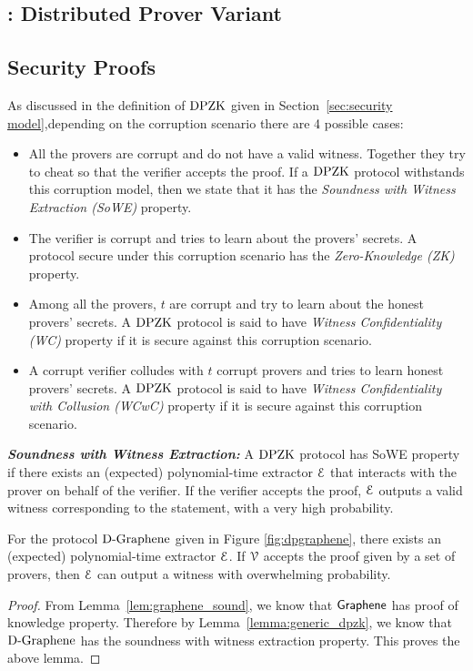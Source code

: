 
\subsection{\dpname: Distributed Prover Variant}
\label{subsec:DPgraphene}

\subsection{Security Proofs}
As discussed in the definition of $\text{DPZK}$ given in Section~\ref{sec:security model},depending on the corruption scenario there are 4 possible cases:
\begin{itemize}
	\item All the provers are corrupt and do not have a valid witness. Together they try to cheat so that the verifier accepts the proof. If a $\text{DPZK}$ protocol withstands this corruption model, then we state that it has the {\em Soundness with Witness Extraction (SoWE)} property.
	\item The verifier is corrupt and tries to learn about the provers' secrets. A protocol secure under this corruption scenario has the {\em Zero-Knowledge (ZK)} property.
	\item Among all the provers, $t$ are corrupt and try to learn about the honest provers' secrets. A $\text{DPZK}$ protocol is said to have \textit{Witness Confidentiality (WC)} property if it is secure against this corruption scenario.
	\item A corrupt verifier colludes with $t$ corrupt provers and tries to learn honest provers' secrets. A $\text{DPZK}$ protocol is said to have \textit{Witness Confidentiality with Collusion (WCwC)} property if it is secure against this corruption scenario.
\end{itemize}
\noindent\textit{\textbf{Soundness with Witness Extraction:}} A $\text{DPZK}$ protocol has {SoWE} property if there exists an (expected) polynomial-time extractor $\mathcal{E}$ that interacts with the prover on behalf of the verifier. If the verifier accepts the proof, $\mathcal{E}$ outputs a valid witness corresponding to the statement, with a very high probability. 
\begin{lemma}
	For the protocol $\text{D-Graphene}$ given in Figure \ref{fig:dpgraphene}, there exists an (expected) polynomial-time extractor $\mathcal{E}$. If $\mathcal{V}$ accepts the proof given by a set of provers, then $\mathcal{E}$ can output a witness with overwhelming probability.
\end{lemma}
\begin{proof}
From Lemma~\ref{lem:graphene_sound}, we know that $\textsf{Graphene}$ has proof of knowledge property. Therefore by Lemma~\ref{lemma:generic_dpzk}, we know that $\text{D-Graphene}$ has the soundness with witness extraction property. This proves the above lemma.
\end{proof}

